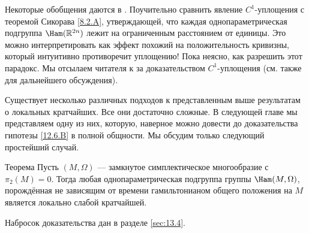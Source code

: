 Некоторые обобщения даются в \cite{LM2}.
Поучительно сравнить явление $C^1$-уплощения с теоремой Сикорава \ref{8.2.A}, утверждающей, что каждая однопараметрическая подгруппа $\Ham(\RR^{2n})$ лежит на ограниченным расстоянием от единицы. 
Это можно интерпретировать как эффект похожий на положительность кривизны, который интуитивно противоречит уплощению! 
Пока неясно, как разрешить этот парадокс.
Мы отсылаем читателя к \cite{BP1,HZ} за доказательством $C^1$-уплощения (см. также \cite{P8} для дальнейшего обсуждения). 

Существует несколько различных подходов к представленным выше результатам о локальных кратчайших. 
Все они достаточно сложные.
В следующей главе мы представляем одну из них, которую, наверное можно довести до доказательства гипотезы \ref{12.6.B} в полной общности. 
Мы обсудим только следующий простейший случай.

\begin{thm}{Теорема}\label{12.6.F}
Пусть $(M, \Omega)$ — замкнутое симплектическое многообразие с $\pi_2(M) = 0$.
Тогда любая однопараметрическая подгруппа группы $\Ham(M, \Omega)$, порождённая не зависящим от времени гамильтонианом общего положения на $M$ является локально слабой кратчайшей. 
\end{thm}

Набросок доказательства дан в разделе \ref{sec:13.4}.
